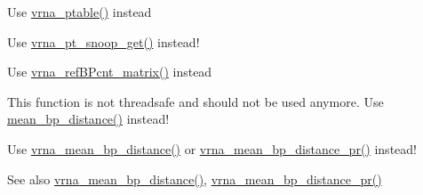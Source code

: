\begin{DoxyRefList}
\item[\label{deprecated__deprecated000132}%
\hypertarget{deprecated__deprecated000132}{}%
Global \hyperlink{group__struct__utils_ga89c32307ee50a0026f4a3131fac0845a}{make\+\_\+pair\+\_\+table} (const char $\ast$structure)]Use \hyperlink{group__struct__utils_gae829fb8bb7f694c12a9c0bbc34c77c60}{vrna\+\_\+ptable()} instead 
\item[\label{deprecated__deprecated000135}%
\hypertarget{deprecated__deprecated000135}{}%
Global \hyperlink{group__struct__utils_ga9aa3bf3b4346bb7fb88efc154dd07a79}{make\+\_\+pair\+\_\+table\+\_\+snoop} (const char $\ast$structure)]Use \hyperlink{group__struct__utils_gaef0f7e1a6c00c81a349973de53039dda}{vrna\+\_\+pt\+\_\+snoop\+\_\+get()} instead!  
\item[\label{deprecated__deprecated000137}%
\hypertarget{deprecated__deprecated000137}{}%
Global \hyperlink{group__struct__utils_ga578cd9712dee812fb1c58aa3cc489864}{make\+\_\+reference\+B\+P\+\_\+array} (short $\ast$reference\+\_\+pt, unsigned int turn)]Use \hyperlink{group__struct__utils_gab4c2a00c99ce1d612ffa5bde114eb96d}{vrna\+\_\+ref\+B\+Pcnt\+\_\+matrix()} instead  
\item[\label{deprecated__deprecated000106}%
\hypertarget{deprecated__deprecated000106}{}%
Global \hyperlink{part__func_8h_ae9556ba7ded44fe2321b6f67c3fc02a3}{mean\+\_\+bp\+\_\+dist} (int length)]This function is not threadsafe and should not be used anymore. Use \hyperlink{group__pf__fold_ga79cbc375af65f11609feb6b055269e7d}{mean\+\_\+bp\+\_\+distance()} instead!  
\item[\label{deprecated__deprecated000100}%
\hypertarget{deprecated__deprecated000100}{}%
Global \hyperlink{group__pf__fold_ga79cbc375af65f11609feb6b055269e7d}{mean\+\_\+bp\+\_\+distance} (int length)]Use \hyperlink{group__pf__fold_gaa6b8983b559b9ef4b2e1b31113ea317b}{vrna\+\_\+mean\+\_\+bp\+\_\+distance()} or \hyperlink{group__pf__fold_gad3f0c240512e6d43e2e4d4c2076021f5}{vrna\+\_\+mean\+\_\+bp\+\_\+distance\+\_\+pr()} instead! \begin{DoxySeeAlso}{See also}
\hyperlink{group__pf__fold_gaa6b8983b559b9ef4b2e1b31113ea317b}{vrna\+\_\+mean\+\_\+bp\+\_\+distance()}, \hyperlink{group__pf__fold_gad3f0c240512e6d43e2e4d4c2076021f5}{vrna\+\_\+mean\+\_\+bp\+\_\+distance\+\_\+pr()} 
\end{DoxySeeAlso}


\end{DoxyRefList}
